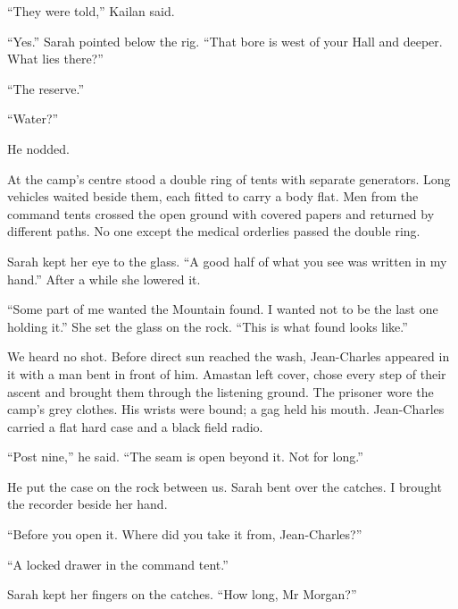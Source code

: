 ``They were told,'' Kailan said.\par

``Yes.'' Sarah pointed below the rig. ``That bore is west of your Hall and deeper. What lies there?''\par

``The reserve.''\par

``Water?''\par

He nodded.\par

At the camp's centre stood a double ring of tents with separate generators. Long vehicles waited beside them, each fitted to carry a body flat. Men from the command tents crossed the open ground with covered papers and returned by different paths. No one except the medical orderlies passed the double ring.\par

Sarah kept her eye to the glass. ``A good half of what you see was written in my hand.'' After a while she lowered it.\par

``Some part of me wanted the Mountain found. I wanted not to be the last one holding it.'' She set the glass on the rock. ``This is what found looks like.''\par

We heard no shot. Before direct sun reached the wash, Jean-Charles appeared in it with a man bent in front of him. Amastan left cover, chose every step of their ascent and brought them through the listening ground. The prisoner wore the camp's grey clothes. His wrists were bound; a gag held his mouth. Jean-Charles carried a flat hard case and a black field radio.\par

``Post nine,'' he said. ``The seam is open beyond it. Not for long.''\par

He put the case on the rock between us. Sarah bent over the catches. I brought the recorder beside her hand.\par

``Before you open it. Where did you take it from, Jean-Charles?''\par

``A locked drawer in the command tent.''\par

Sarah kept her fingers on the catches. ``How long, Mr Morgan?''\par


